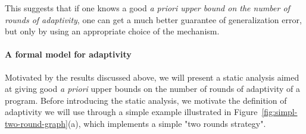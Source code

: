 This suggests that if one knows a good \emph{a priori upper bound on the number of rounds of adaptivity}, one can get a much better guarantee of generalization error, but only by using an appropriate choice of the mechanism.


\paragraph{A formal model for adaptivity}
Motivated by the results discussed above, we will present a static analysis aimed at giving good \emph{a priori} upper bounds on the number of rounds of adaptivity of a program. Before introducing the static analysis, we motivate the definition of adaptivity we will use through a simple example illustrated in Figure~\ref{fig:simpl-two-round-graph}(a), which implements a simple "two rounds strategy".


